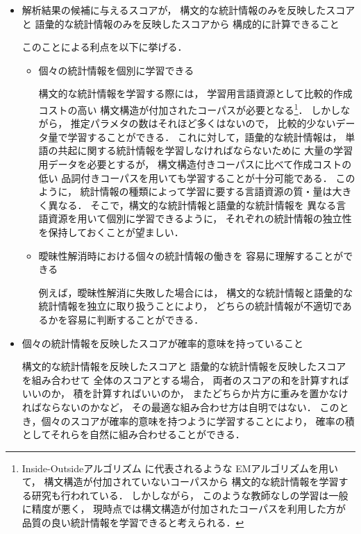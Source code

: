 \begin{itemize}

\item
  解析結果の候補に与えるスコアが，
  構文的な統計情報のみを反映したスコアと
  語彙的な統計情報のみを反映したスコアから
  構成的に計算できること

  このことによる利点を以下に挙げる．
  \begin{itemize}
  \item 個々の統計情報を個別に学習できる

    構文的な統計情報を学習する際には，
    学習用言語資源として比較的作成コストの高い
    構文構造が付加されたコーパスが必要となる\footnote{
      Inside-Outsideアルゴリズム\cite{lari:90:a} に代表されるような
      EMアルゴリズムを用いて，
      構文構造が付加されていないコーパスから
      構文的な統計情報を学習する研究も行われている．
      しかしながら，
      このような教師なしの学習は一般に精度が悪く，
      現時点では構文構造が付加されたコーパスを利用した方が
      品質の良い統計情報を学習できると考えられる．
      }．
    しかしながら，
    推定パラメタの数はそれほど多くはないので，
    比較的少ないデータ量で学習することができる．
    これに対して，語彙的な統計情報は，
    単語の共起に関する統計情報を学習しなければならないために
    大量の学習用データを必要とするが，
    構文構造付きコーパスに比べて作成コストの低い
    品詞付きコーパスを用いても学習することが十分可能である．
    このように，
    統計情報の種類によって学習に要する言語資源の質・量は大きく異なる．
    そこで，構文的な統計情報と語彙的な統計情報を
    異なる言語資源を用いて個別に学習できるように，
    それぞれの統計情報の独立性を保持しておくことが望ましい．

  \item
    曖昧性解消時における個々の統計情報の働きを
    容易に理解することができる

    例えば，曖昧性解消に失敗した場合には，
    構文的な統計情報と語彙的な統計情報を独立に取り扱うことにより，
    どちらの統計情報が不適切であるかを容易に判断することができる．
  \end{itemize}

\item 
  個々の統計情報を反映したスコアが確率的意味を持っていること

  構文的な統計情報を反映したスコアと
  語彙的な統計情報を反映したスコアを組み合わせて
  全体のスコアとする場合，
  両者のスコアの和を計算すればいいのか，
  積を計算すればいいのか，
  またどちらか片方に重みを置かなければならないのかなど，
  その最適な組み合わせ方は自明ではない．
  このとき，個々のスコアが確率的意味を持つように学習することにより，
  確率の積としてそれらを自然に組み合わせることができる．
\end{itemize}

